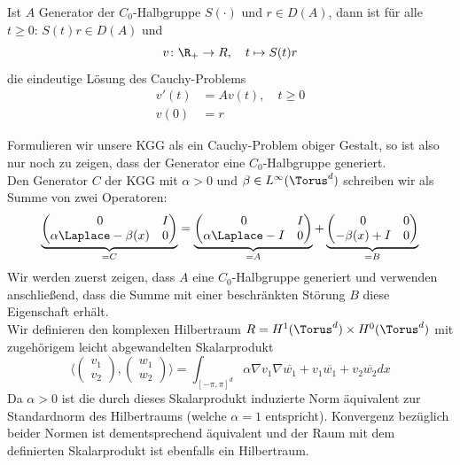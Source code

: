 \begin{maththeorem}
Ist $A$ Generator der $C_0$-Halbgruppe $S(\cdot)$ und $r\in D(A)$, dann ist für alle $t\ge 0\colon \,S(t)r\in D(A)$ und
\[v\colon \R_+\to R,\quad t\mapsto S(t)r\]
die eindeutige Lösung des Cauchy-Problems
\begin{equation}
\begin{split}
v'(t)&=Av(t),\quad t\ge 0\\
v(0)&=r
\end{split}
\end{equation}
\end{maththeorem}
Formulieren wir unsere KGG als ein Cauchy-Problem obiger Gestalt, so ist also nur noch zu zeigen, dass der Generator eine $C_0$-Halbgruppe generiert.\\
Den Generator $C$ der KGG mit $\alpha>0$ und $\beta\in L^\infty(\Torus^d)$ schreiben wir als Summe von zwei Operatoren:
\[\underbrace{\begin{pmatrix}0 & I\\ \alpha\Laplace -\beta(x) & 0\end{pmatrix}}_{=C}
=\underbrace{\begin{pmatrix}0 & I\\ \alpha\Laplace-I & 0\end{pmatrix}}_{=A}
+\underbrace{\begin{pmatrix}0 & 0\\ -\beta(x)+I & 0\end{pmatrix}}_{=B}\]
Wir werden zuerst zeigen, dass $A$ eine $C_0$-Halbgruppe generiert und verwenden anschließend, dass die Summe mit einer beschränkten Störung $B$ diese Eigenschaft erhält.\\[0.2cm]
Wir definieren den komplexen Hilbertraum $R=H^1(\Torus^d)\times H^0(\Torus^d)$ mit zugehörigem leicht abgewandelten Skalarprodukt 
\[\langle \begin{pmatrix}v_1\\v_2\end{pmatrix}, \begin{pmatrix}w_1\\w_2\end{pmatrix}\rangle =\int_{[-\pi,\pi]^d}\alpha \nabla v_1\nabla \overline{w_1}+v_1\overline{w_1}+ v_2\overline{w_2}dx\]
Da $\alpha>0$ ist die durch dieses Skalarprodukt induzierte Norm äquivalent zur Standardnorm des Hilbertraums (welche $\alpha=1$ entspricht). Konvergenz bezüglich beider Normen ist dementsprechend äquivalent und der Raum mit dem definierten Skalarprodukt ist ebenfalls ein Hilbertraum.\\
